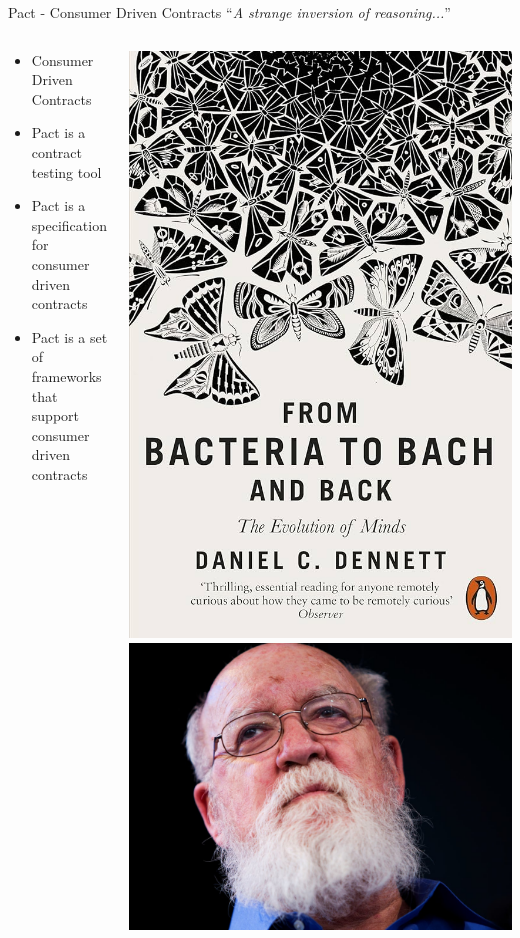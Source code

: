\begin{frame}{Pact - Consumer Driven Contracts}
    "`\textit{A strange inversion of reasoning...}"'
    \begin{columns}
        \begin{column}{0.5\textwidth}
            \begin{itemize}
                \item Consumer Driven Contracts
                \item Pact is a contract testing tool
                \item Pact is a specification for consumer driven contracts
                \item Pact is a set of frameworks that support consumer driven contracts
            \end{itemize}
        \end{column}
        \begin{column}{0.5\textwidth}
            \begin{center}
                \includegraphics[width=.5\textwidth]{./assets/bacteria}
                \includegraphics[width=.5\textwidth]{./assets/dennet}
            \end{center}
        \end{column}

    \end{columns}
\end{frame}
